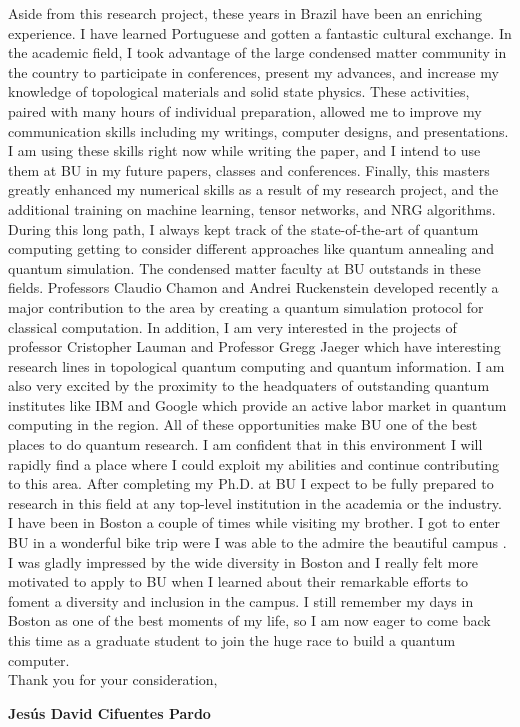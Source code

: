 \documentclass[11pt,a4paper,sans]{moderncv}        %
\begin{document}
Aside from this research project, these years in Brazil have been an enriching experience. I have learned Portuguese and gotten a fantastic cultural exchange. In the academic field, I took advantage of the large condensed matter community in the country to participate in conferences, present my advances, and increase my knowledge of topological materials and solid state physics. These activities, paired with many hours of individual preparation, allowed me to improve my communication skills including my writings, computer designs, and presentations. I am using these skills right now while writing the paper, and I intend to use them at BU in my future papers, classes and conferences. Finally, this masters greatly enhanced my numerical skills as a result of my research project, and the additional training on machine learning, tensor networks, and NRG algorithms. \\



During this long path, I always kept track of the state-of-the-art of quantum computing getting to consider different approaches like quantum annealing and quantum simulation. The condensed matter faculty at BU outstands in these fields. Professors Claudio Chamon and Andrei Ruckenstein developed recently a major contribution to the area by creating a quantum simulation protocol for classical computation. In addition, I am very interested in the projects of professor Cristopher Lauman  and  Professor Gregg Jaeger which have interesting research lines in topological quantum computing and quantum information. I am also very excited by the proximity to the headquaters of outstanding quantum institutes like IBM and Google which provide an active labor market in quantum computing in the region. All of these opportunities make BU one of the best places to do quantum research.  I am confident that in this environment I will rapidly find a place where I could exploit my abilities and continue contributing to this area. After completing my Ph.D. at BU  I expect to  be fully prepared to research in this field at any top-level institution in the academia or the industry.\\

I have been in Boston a couple of times while visiting my brother. I got to enter BU in a wonderful bike trip were I was able to the admire the beautiful campus . I was gladly impressed by the wide diversity in Boston and I really felt more motivated to apply to BU when I learned about their remarkable efforts to foment a diversity and inclusion in the campus. I still remember my days in Boston as one of the best moments of my life, so I am now eager to come back this time as a graduate student to join the huge race to build a quantum computer. \\


Thank you for your consideration, 



\vspace{0.5cm}

\textbf{Jesús David Cifuentes Pardo}




%
%

%
\end{document}
